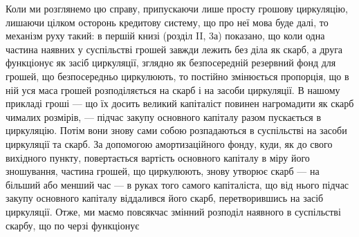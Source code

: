 Коли ми розглянемо цю справу, припускаючи лише просту грошову
циркуляцію, лишаючи цілком осторонь кредитову систему, що про неї
мова буде далі, то механізм руху такий: в першій книзі (розділ II, 3а)
показано, що коли одна частина наявних у суспільстві грошей завжди
лежить без діла як скарб, а друга функціонує як засіб циркуляції, зглядно
як безпосередній резервний фонд для грошей, що безпосередньо циркулюють,
то постійно змінюється пропорція, що в ній уся маса грошей
розподіляється на скарб і на засоби циркуляції. В нашому прикладі
гроші — що їх досить великий капіталіст повинен нагромадити як скарб
чималих розмірів, — підчас закупу основного капіталу разом пускається
в циркуляцію. Потім вони знову сами собою розпадаються в суспільстві
на засоби циркуляції та скарб. За допомогою амортизаційного фонду,
куди, як до свого вихідного пункту, повертається вартість основного капіталу
в міру його зношування, частина грошей, що циркулюють, знову
утворює скарб — на більший або менший час — в руках того самого капіталіста,
що від нього підчас закупу основного капіталу віддалився його
скарб, перетворившись на засіб циркуляції. Отже, ми маємо повсякчас
змінний розподіл наявного в суспільстві скарбу, що по черзі функціонує
\parbreak{}  %
